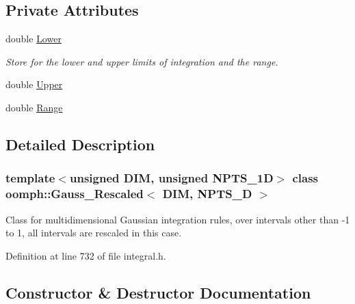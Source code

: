 \subsection*{Private Attributes}
\begin{DoxyCompactItemize}
\item 
double \hyperlink{classoomph_1_1Gauss__Rescaled_a262c62b0e60955110b0a96f535d45637}{Lower}
\begin{DoxyCompactList}\small\item\em Store for the lower and upper limits of integration and the range. \end{DoxyCompactList}\item 
double \hyperlink{classoomph_1_1Gauss__Rescaled_aca2fff700e5ffabad7c8ed9368f84b6e}{Upper}
\item 
double \hyperlink{classoomph_1_1Gauss__Rescaled_a7e672d9297429ca22f6ace978ec6893e}{Range}
\end{DoxyCompactItemize}


\subsection{Detailed Description}
\subsubsection*{template$<$unsigned D\+IM, unsigned N\+P\+T\+S\+\_\+1D$>$\newline
class oomph\+::\+Gauss\+\_\+\+Rescaled$<$ D\+I\+M, N\+P\+T\+S\+\_\+D $>$}

Class for multidimensional Gaussian integration rules, over intervals other than -\/1 to 1, all intervals are rescaled in this case. 

Definition at line 732 of file integral.\+h.



\subsection{Constructor \& Destructor Documentation}
\mbox{\label{classoomph_1_1Gauss__Rescaled_a3069cb5af93b223e5aa2170b0aa3239f}} 
